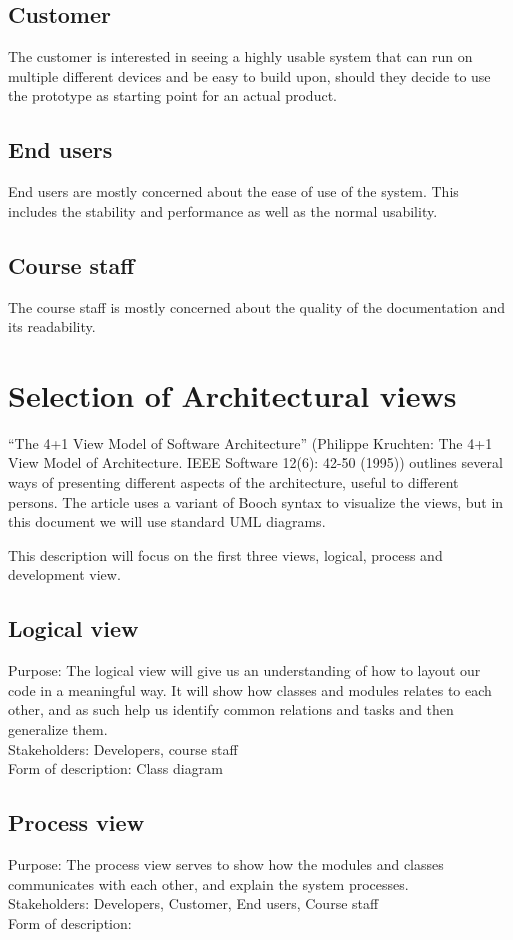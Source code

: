 \documentclass[11pt]{book}
\begin{document}
\subsection{Customer}
The customer is interested in seeing a highly usable system that can run on multiple different devices and be easy to build upon, should they decide to use the prototype as starting point for an actual product.

\subsection{End users}
End users are mostly concerned about the ease of use of the system. This includes the stability and performance as well as the normal usability.

\subsection{Course staff}
The course staff is mostly concerned about the quality of the documentation and its readability.

\section{Selection of Architectural views}
``The 4+1 View Model of Software Architecture'' (Philippe Kruchten: The 4+1 View Model of Architecture. IEEE Software 12(6): 42-50 (1995)) outlines several ways of presenting different aspects of the architecture, useful to different persons. The article uses a variant of Booch syntax to visualize the views, but in this document we will use standard UML diagrams.

This description will focus on the first three views, logical, process and development view.

\subsection{Logical view}
Purpose: The logical view will give us an understanding of how to layout our code in a meaningful way. It will show how classes and modules relates to each other, and as such help us identify common relations and tasks and then generalize them.\\
Stakeholders: Developers, course staff\\
Form of description: Class diagram

\subsection{Process view}
Purpose: The process view serves to show how the modules and classes communicates with each other, and explain the system processes.\\
Stakeholders: Developers, Customer, End users, Course staff\\
Form of description: 
\end{document}

